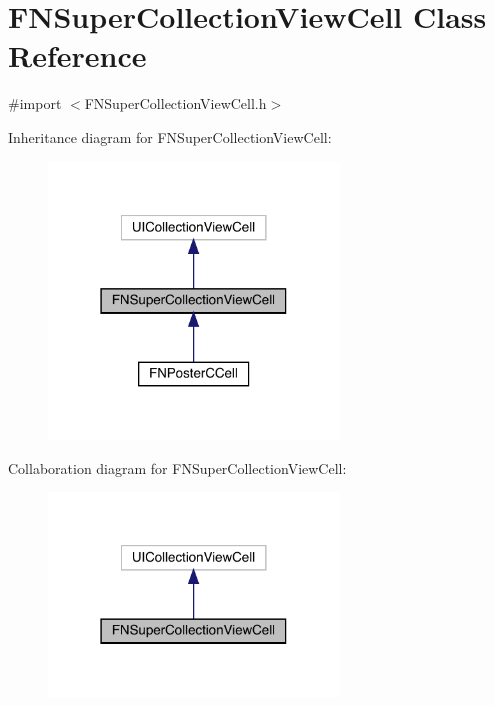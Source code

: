\hypertarget{interface_f_n_super_collection_view_cell}{}\section{F\+N\+Super\+Collection\+View\+Cell Class Reference}
\label{interface_f_n_super_collection_view_cell}


{\ttfamily \#import $<$F\+N\+Super\+Collection\+View\+Cell.\+h$>$}



Inheritance diagram for F\+N\+Super\+Collection\+View\+Cell\+:\nopagebreak
\begin{figure}[H]
\begin{center}
\leavevmode
\includegraphics[width=219pt]{interface_f_n_super_collection_view_cell__inherit__graph}
\end{center}
\end{figure}


Collaboration diagram for F\+N\+Super\+Collection\+View\+Cell\+:\nopagebreak
\begin{figure}[H]
\begin{center}
\leavevmode
\includegraphics[width=219pt]{interface_f_n_super_collection_view_cell__coll__graph}
\end{center}
\end{figure}


